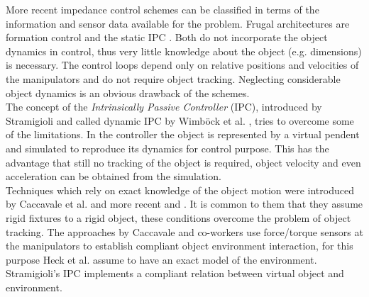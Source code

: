 \documentclass[a4paper,twoside, openright,12pt]{report}
\begin{document}
More recent impedance control schemes can be classified in terms of the information and sensor data available for the problem. Frugal architectures are formation control \cite{Sieber_15} and the static IPC \cite{Wimboeck_06}. Both do not incorporate the object dynamics in control, thus very little knowledge about the object (e.g. dimensions) is necessary. The control loops depend only on relative positions and velocities of the manipulators and do not require object tracking. Neglecting considerable object dynamics is an obvious drawback of the schemes.\\
The concept of the \emph{Intrinsically Passive Controller} (IPC), introduced by Stramigioli \cite{Stramigioli_01} and called dynamic IPC by Wimb\"ock et al. \cite{Wimboeck_08}, tries to overcome some of the limitations. In the controller the object is represented by a virtual pendent and simulated to reproduce its dynamics for control purpose. This has the advantage that still no tracking of the object is required, object velocity and even acceleration can be obtained from the simulation. \\
Techniques which rely on exact knowledge of the object motion were introduced by Caccavale et al. \cite{Caccavale_01,Caccavale_08} and more recent \cite{Heck_13} and \cite{DePascali_15}. It is common to them that they assume rigid fixtures to a rigid object, these conditions overcome the problem of object tracking. The approaches by Caccavale and co-workers use force/torque sensors at the manipulators to establish compliant object environment interaction, for this purpose Heck et al. \cite{Heck_13} assume to have an exact model of the environment. Stramigioli's IPC implements a compliant relation between virtual object and environment. \\
\end{document}
